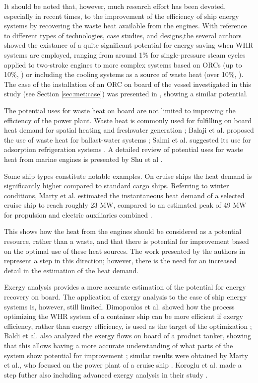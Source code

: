 \documentclass[preprint,12pt]{elsarticle}
\begin{document}
It should be noted that, however, much research effort has been devoted, especially in recent times, to the improvement of the efficiency of ship energy systems by recovering the waste heat available from the engines. With reference to different types of technologies, case studies, and designs,the several authors showed the existance of a quite significant potential for energy saving when WHR systems are employed, ranging from around 1\% for single-pressure steam cycles applied to two-stroke engines \cite{Theotokatos2012} to more complex systems based on ORCs (up to 10\%, \cite{Hountalas2012}) or including the cooling systems as a source of waste heat (over 10\%, \cite{Dimopoulos2012}).  The case of the installation of an ORC on board of the vessel investigated in this study (see Section \ref{sec:met:case}) was presented in \cite{Mondejar2017}, showing a similar potential.

The potential uses for waste heat on board are not limited to improving the efficiency of the power plant. Waste heat is commonly used for fulfilling on board heat demand for spatial heating and freshwater generation \cite{Molland2011,Baldi2015a,Mccarthy1990};  Balaji et al. proposed the use of waste heat for ballast-water systems \cite{Balaji2012}; Salmi et al. suggested its use for adsorption refrigeration systems \cite{Salmi2017}. A detailed review of potential uses for waste heat from marine engines is presented by Shu et al \cite{Shu2013}. 

Some ship types constitute notable examples. On cruise ships the heat demand is significantly higher compared to standard cargo ships. Referring to winter conditions, Marty et al. estimated the instantaneous heat demand of a selected cruise ship to reach roughly 23 MW, compared to an estimated peak of 49 MW for propulsion and electric auxiliaries combined \cite{Marty2012}.  


This shows how the heat from the engines should be considered as a potential resource, rather than a waste, and that there is potential for improvement based on the optimal use of these heat sources. The work presented by the authors in \cite{Baldi2016} represent a step in this direction; however, there is the need for an increased detail in the estimation of the heat demand. 

Exergy analysis provides a more accurate estimation of the potential for energy recovery on board. The application of exergy analysis to the case of ship energy systems is, however, still limited. Dimopoulos et al. showed how the process optimizing the WHR system of a container ship can be more efficient if exergy efficiency, rather than energy efficiency, is used as the target of the optimization \cite{Dimopoulos2012}; Baldi et al. also analyzed the exergy flows on board of a product tanker, showing that this allows having a more accurate understanding of what parts of the system show potential for improvement \cite{Baldi2015a}; similar results were obtained by Marty et al., who focused on the power plant of a cruise ship \cite{Marty2016}. Koroglu et al. made a step futher also including advanced exergy analysis in their study \cite{Koroglu2017}.
\end{document}
